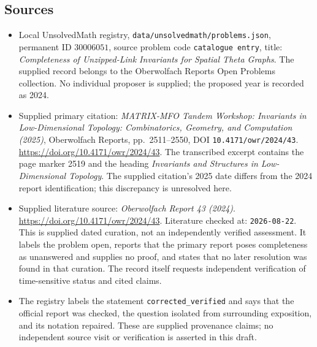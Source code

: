 \documentclass[11pt]{article}
\begin{document}
\subsection{Sources}
\begin{itemize}
\item Local UnsolvedMath registry, \texttt{data/unsolvedmath/problems.json}, permanent ID \(30006051\), source problem code \texttt{catalogue entry}, title: \emph{Completeness of Unzipped-Link Invariants for Spatial Theta Graphs}. The supplied record belongs to the Oberwolfach Reports Open Problems collection. No individual proposer is supplied; the proposed year is recorded as 2024.
\item Supplied primary citation: \emph{MATRIX-MFO Tandem Workshop: Invariants in Low-Dimensional Topology: Combinatorics, Geometry, and Computation (2025)}, Oberwolfach Reports, pp.\ 2511--2550, DOI \texttt{10.4171/owr/2024/43}. \url{https://doi.org/10.4171/owr/2024/43}. The transcribed excerpt contains the page marker 2519 and the heading \emph{Invariants and Structures in Low-Dimensional Topology}. The supplied citation's 2025 date differs from the 2024 report identification; this discrepancy is unresolved here.
\item Supplied literature source: \emph{Oberwolfach Report 43 (2024)}. \url{https://doi.org/10.4171/owr/2024/43}. Literature checked at: \texttt{2026-08-22}. This is supplied dated curation, not an independently verified assessment. It labels the problem open, reports that the primary report poses completeness as unanswered and supplies no proof, and states that no later resolution was found in that curation. The record itself requests independent verification of time-sensitive status and cited claims.
\item The registry labels the statement \texttt{corrected\_verified} and says that the official report was checked, the question isolated from surrounding exposition, and its notation repaired. These are supplied provenance claims; no independent source visit or verification is asserted in this draft.
\end{itemize}
\end{document}
